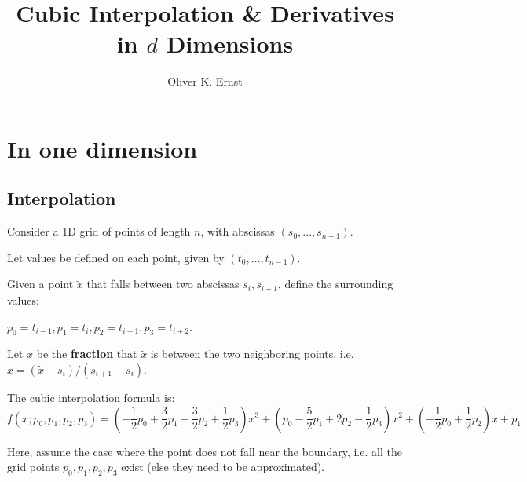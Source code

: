 \documentclass[11pt]{article}
\title{Cubic Interpolation \& Derivatives in $d$ Dimensions}
\author{Oliver K. Ernst}
\begin{document}
\maketitle

\tableofcontents


\section{In one dimension}



\subsection{Interpolation}


Consider a $1$D grid of points of length $n$, with abscissas $(s_0, \dots, s_{n-1})$.

Let values be defined on each point, given by $(t_0,\dots,t_{n-1})$.

Given a point $\tilde{x}$ that falls between two abscissas $s_i, s_{i+1}$, define the surrounding values:

$p_0 = t_{i-1}, p_1 = t_i, p_2 = t_{i+1}, p_3 = t_{i+2}$. 

Let $x$ be the \textbf{fraction} that $\tilde{x}$ is between the two neighboring points, i.e. $x = (\tilde{x} - s_i) / (s_{i+1} - s_i)$.

The cubic interpolation formula is:
\begin{equation}
f(x ; p_0, p_1, p_2, p_3) = \left ( - \frac{1}{2} p_0 + \frac{3}{2} p_1 - \frac{3}{2} p_2 + \frac{1}{2} p_3 \right ) x^3 + \left ( p_0 - \frac{5}{2} p_1 + 2 p_2 - \frac{1}{2} p_3 \right ) x^2 + \left ( - \frac{1}{2} p_0 + \frac{1}{2} p_2 \right ) x + p_1
\end{equation}

Here, assume the case where the point does not fall near the boundary, i.e. all the grid points $p_0,p_1,p_2,p_3$ exist (else they need to be approximated).
\end{document}
